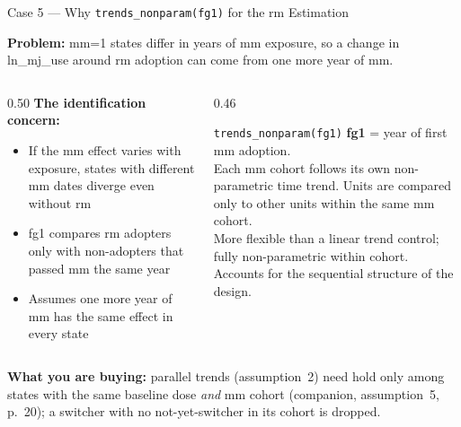 \documentclass[main.tex]{subfiles}
\begin{document}
\begin{frame}{Case 5 --- Why \texttt{trends\_nonparam(fg1)} for the rm Estimation}

  \textbf{Problem:} mm=1 states differ in years of mm exposure, so a change
  in ln\_mj\_use around rm adoption can come from one more year of mm.

  \medskip
  \begin{columns}[T]
    \begin{column}{0.50\textwidth}
      \textbf{The identification concern:}
      \begin{itemize}\small
        \item If the mm effect varies with exposure, states
          with different mm dates diverge even without rm
        \item fg1 compares rm adopters only with
          non-adopters that passed mm the same year
        \item Assumes one more year of mm has the
          same effect in every state
      \end{itemize}
    \end{column}
    \begin{column}{0.46\textwidth}
      \begin{block}{\texttt{trends\_nonparam(fg1)}}
        \footnotesize
        \textbf{fg1} = year of first mm adoption.\\[4pt]
        Each mm cohort follows its own
        non-parametric time trend.
        Units are compared only to other
        units within the same mm cohort.\\[4pt]
        More flexible than a linear trend
        control; fully non-parametric within
        cohort. Accounts for the sequential
        structure of the design.
      \end{block}
    \end{column}
  \end{columns}

  \smallskip
  \footnotesize \textbf{What you are buying:} parallel trends (assumption~2)
  need hold only among states with the same baseline dose \emph{and} mm
  cohort (companion, assumption~5, p.~20); a switcher with no
  not-yet-switcher in its cohort is dropped.

\end{frame}
\end{document}
